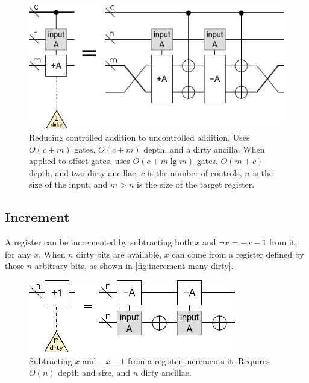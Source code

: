 \documentclass[twocolumn,longbibliography]{quantumarticle-customized}
\begin{document}
\begin{figure}
  \centering
  \includegraphics[width=\linewidth]{assets/controlled-addition.png}
  \caption{
    Reducing controlled addition to uncontrolled addition.
    Uses $O(c + m)$ gates, $O(c + m)$ depth, and a dirty ancilla.
    When applied to offset gates, uses $O(c + m \lg m)$ gates, $O(m + c)$ depth, and two dirty ancillae.
    $c$ is the number of controls, $n$ is the size of the input, and $m > n$ is the size of the target register.
  }
  \label{fig:controlled-addition}
\end{figure}


\subsection{Increment}

A register can be incremented by subtracting both $x$ and $\neg x = -x-1$ from it, for any $x$.
When $n$ dirty bits are available, $x$ can come from a register defined by those $n$ arbitrary bits, as shown in \autoref{fig:increment-many-dirty}.

\begin{figure}
  \centering
  \includegraphics[width=\linewidth]{assets/increment-many-dirty.png}
  \caption{ Subtracting $x$ and $-x-1$ from a register increments it. Requires $O(n)$ depth and size, and $n$ dirty ancillae.}
  \label{fig:increment-many-dirty}
\end{figure}
\end{document}
